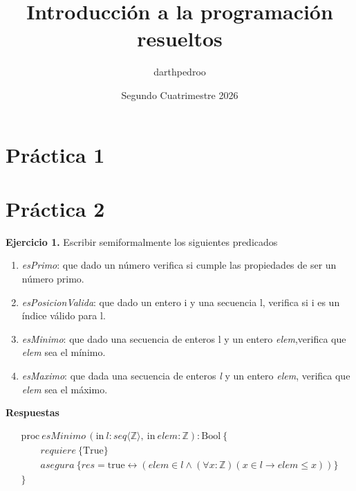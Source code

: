 \documentclass{article}
\author{darthpedroo}
\title{Introducción a la programación resueltos}
\date{Segundo Cuatrimestre 2026}
\begin{document}
\maketitle

\section{Práctica 1}

\section{Práctica 2}

\textbf{Ejercicio 1.} Escribir semiformalmente los siguientes predicados

\begin{enumerate}
\item{\textit{esPrimo}: que dado un número verifica si cumple las propiedades de ser un número primo.}
\item{\textit{esPosicionValida}: que dado un entero i y una secuencia l, verifica si i es un índice válido para l.}
\item{\textit{esMinimo}: que dado una secuencia de enteros l y un entero \textit{elem},verifica que \textit{elem} sea el mínimo.}
\item{\textit{esMaximo}: que dada una secuencia de enteros \textit{l} y un entero \textit{elem}, verifica que \textit{elem} sea el máximo.}
\end{enumerate}

\textbf{Respuestas}

\[
\begin{array}{l}
\mathrm{proc}\ \mathit{esMinimo}\,(\mathrm{in}\ l : \mathit{seq}\langle\mathbb{Z}\rangle,\ \mathrm{in}\ \mathit{elem} : \mathbb{Z}) : \mathrm{Bool}\ \{ \\
\qquad \mathit{requiere}\ \{\mathrm{True}\} \\
\qquad \mathit{asegura}\ \{\mathit{res} = \mathrm{true} \leftrightarrow (\mathit{elem} \in l \wedge (\forall x : \mathbb{Z})(x \in l \rightarrow \mathit{elem} \leq x))\} \\
\}
\end{array}
\]
\end{document}
